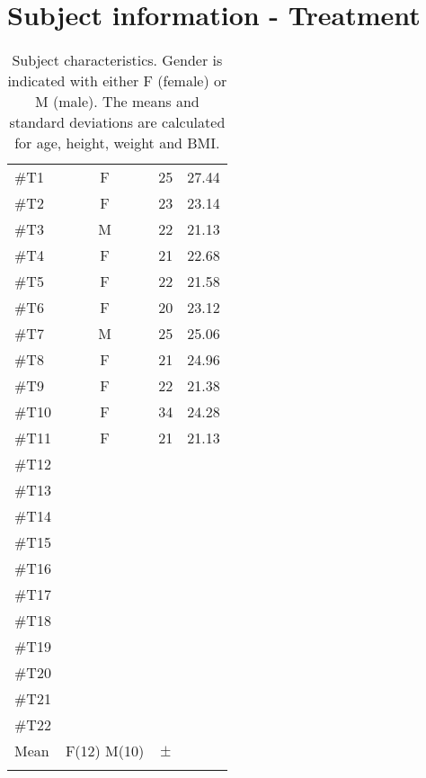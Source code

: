 \section{Subject information - Treatment}
\begin{longtable}{l|c|c|c}
	\rowcolor[HTML]{C0C0C0} \rule{0pt}{3ex}  \color[HTML]{000000}{Subject} & \color[HTML]{000000}{Gender} & \color[HTML]{000000}{Age} &  \color[HTML]{000000}{BMI} 
	\\ \hline \rule{0pt}{3ex} 
\#T1 & F  & 25  & 27.44  \\ \hline \hline \rule{0pt}{3ex} 
\#T2 & F & 23 & 23.14  \\ \hline \hline \rule{0pt}{3ex} 
\#T3 & M & 22 & 21.13  \\ \hline \hline \rule{0pt}{3ex} 
\#T4 & F & 21  & 22.68  \\ \hline \hline \rule{0pt}{3ex} 
\#T5 & F & 22 & 21.58   \\ \hline \hline \rule{0pt}{3ex} 
\#T6 & F & 20 & 23.12 \\ \hline \hline \rule{0pt}{3ex} 
\#T7 & M & 25  & 25.06  \\ \hline \hline \rule{0pt}{3ex} 
	\#T8 & F & 21 & 24.96  \\ \hline \hline \rule{0pt}{3ex} 
	\#T9 & F & 22 & 21.38   \\ \hline \hline \rule{0pt}{3ex} 
	\#T10 & F & 34 & 24.28  \\ \hline \hline \rule{0pt}{3ex} 
	\#T11 & F & 21 & 21.13 \\ \hline \hline \rule{0pt}{3ex} 
\#T12 &  &  & \\ \hline \hline \rule{0pt}{3ex} 
\#T13 &  &  &  \\ \hline \hline \rule{0pt}{3ex} 
\#T14 &  &  &   \\ \hline \hline \rule{0pt}{3ex} 
\#T15 &  &  &  \\ \hline \hline \rule{0pt}{3ex} 
\#T16 &  &  &  \\ \hline \hline \rule{0pt}{3ex} 
\#T17 &  &  &   \\ \hline \hline \rule{0pt}{3ex} 
	\#T18 &  &  &  \\ \hline \hline \rule{0pt}{3ex} 
	\#T19 &  &  &  \\ \hline \hline \rule{0pt}{3ex} 
	\#T20 &  &  &   \\ \hline \hline \rule{0pt}{3ex}
		\#T21 &  &  &  \\ \hline \hline \rule{0pt}{3ex} 
	\#T22 &  &  &  \\ \hline \hline \rule{0pt}{3ex}  
	Mean & F(12) M(10) & $\pm$  & 
	\\ \hline 
	\caption{Subject characteristics. Gender is indicated with either F (female) or M (male). The means and standard deviations are calculated for age, height, weight and BMI.}
	\label{tab:subjects}
\end{longtable}
\vspace{-.5cm}


